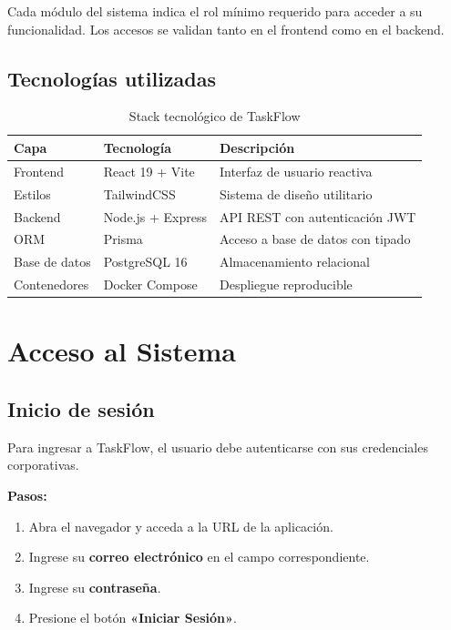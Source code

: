 \documentclass[12pt, a4paper]{article}
\begin{document}
\begin{infobox}[Importante]
Cada módulo del sistema indica el rol mínimo requerido para acceder a su funcionalidad. Los accesos se validan tanto en el frontend como en el backend.
\end{infobox}

\subsection{Tecnologías utilizadas}

\begin{table}[H]
\centering
\begin{tabularx}{\textwidth}{L{3.5cm} L{4cm} L{6cm}}
\toprule
\textbf{Capa} & \textbf{Tecnología} & \textbf{Descripción} \\
\midrule
Frontend  & React 19 + Vite   & Interfaz de usuario reactiva \\
Estilos   & TailwindCSS       & Sistema de diseño utilitario \\
Backend   & Node.js + Express & API REST con autenticación JWT \\
ORM       & Prisma            & Acceso a base de datos con tipado \\
Base de datos & PostgreSQL 16 & Almacenamiento relacional \\
Contenedores & Docker Compose & Despliegue reproducible \\
\bottomrule
\end{tabularx}
\caption{Stack tecnológico de TaskFlow}
\end{table}

\section{Acceso al Sistema}

\subsection{Inicio de sesión}

Para ingresar a TaskFlow, el usuario debe autenticarse con sus credenciales corporativas.

\textbf{Pasos:}
\begin{enumerate}
  \item Abra el navegador y acceda a la URL de la aplicación.
  \item Ingrese su \textbf{correo electrónico} en el campo correspondiente.
  \item Ingrese su \textbf{contraseña}.
  \item Presione el botón \textbf{«Iniciar Sesión»}.
\end{enumerate}
\end{document}

